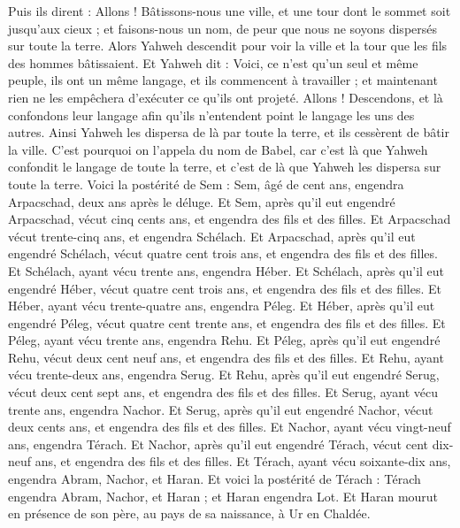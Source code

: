 \begin{multicols}{2}
Puis ils dirent : Allons ! Bâtissons-nous une ville, et une tour dont le sommet soit jusqu'aux cieux ; et faisons-nous un nom, de peur que nous ne soyons dispersés sur toute la terre.
Alors Yahweh descendit pour voir la ville et la tour que les fils des hommes bâtissaient.
Et Yahweh dit : Voici, ce n'est qu'un seul et même peuple, ils ont un même langage, et ils commencent à travailler ; et maintenant rien ne les empêchera d'exécuter ce qu'ils ont projeté.
Allons ! Descendons, et là confondons leur langage afin qu'ils n'entendent point le langage les uns des autres.
Ainsi Yahweh les dispersa de là par toute la terre, et ils cessèrent de bâtir la ville.
C'est pourquoi on l'appela du nom de Babel, car c'est là que Yahweh confondit le langage de toute la terre, et c'est de là que Yahweh les dispersa sur toute la terre.
Voici la postérité de Sem : Sem, âgé de cent ans, engendra Arpacschad, deux ans après le déluge.
Et Sem, après qu'il eut engendré Arpacschad, vécut cinq cents ans, et engendra des fils et des filles.
Et Arpacschad vécut trente-cinq ans, et engendra Schélach.
Et Arpacschad, après qu'il eut engendré Schélach, vécut quatre cent trois ans, et engendra des fils et des filles.
Et Schélach, ayant vécu trente ans, engendra Héber.
Et Schélach, après qu'il eut engendré Héber, vécut quatre cent trois ans, et engendra des fils et des filles.
Et Héber, ayant vécu trente-quatre ans, engendra Péleg.
Et Héber, après qu'il eut engendré Péleg, vécut quatre cent trente ans, et engendra des fils et des filles.
Et Péleg, ayant vécu trente ans, engendra Rehu.
Et Péleg, après qu'il eut engendré Rehu, vécut deux cent neuf ans, et engendra des fils et des filles.
Et Rehu, ayant vécu trente-deux ans, engendra Serug.
Et Rehu, après qu'il eut engendré Serug, vécut deux cent sept ans, et engendra des fils et des filles.
Et Serug, ayant vécu trente ans, engendra Nachor.
Et Serug, après qu'il eut engendré Nachor, vécut deux cents ans, et engendra des fils et des filles.
Et Nachor, ayant vécu vingt-neuf ans, engendra Térach.
Et Nachor, après qu'il eut engendré Térach, vécut cent dix-neuf ans, et engendra des fils et des filles.
Et Térach, ayant vécu soixante-dix ans, engendra Abram, Nachor, et Haran.
Et voici la postérité de Térach : Térach engendra Abram, Nachor, et Haran ; et Haran engendra Lot.
Et Haran mourut en présence de son père, au pays de sa naissance, à Ur en Chaldée.

\end{multicols}
